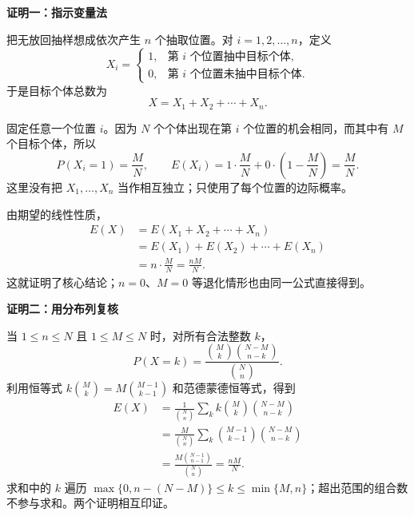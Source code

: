 \clearpage
\begin{proofbox}
	\textbf{\textcolor{CProof}{证明一：指示变量法}}

	把无放回抽样想成依次产生 $n$ 个抽取位置。对 $i=1,2,\ldots,n$，定义
	\[
		X_i=
		\begin{cases}
			1,&\text{第 $i$ 个位置抽中目标个体},\\
			0,&\text{第 $i$ 个位置未抽中目标个体}.
		\end{cases}
	\]
	于是目标个体总数为
	\[
		X=X_1+X_2+\cdots+X_n.
	\]

	固定任意一个位置 $i$。因为 $N$ 个个体出现在第 $i$ 个位置的机会相同，而其中有 $M$ 个目标个体，所以
	\[
		P(X_i=1)=\frac{M}{N},
		\qquad
		E(X_i)=1\cdot\frac{M}{N}+0\cdot\left(1-\frac{M}{N}\right)=\frac{M}{N}.
	\]
	这里没有把 $X_1,\ldots,X_n$ 当作相互独立；只使用了每个位置的边际概率。

	由期望的线性性质，
	\[
		\begin{aligned}
			E(X)
			&=E(X_1+X_2+\cdots+X_n)\\
			&=E(X_1)+E(X_2)+\cdots+E(X_n)\\
			&=n\cdot\frac{M}{N}
			=\frac{nM}{N}.
		\end{aligned}
	\]
	这就证明了核心结论；$n=0$、$M=0$ 等退化情形也由同一公式直接得到。

	\medskip
	\textbf{\textcolor{CProof}{证明二：用分布列复核}}

	当 $1\le n\le N$ 且 $1\le M\le N$ 时，对所有合法整数 $k$，
	\[
		P(X=k)=\frac{\binom{M}{k}\binom{N-M}{n-k}}{\binom{N}{n}}.
	\]
	利用恒等式 $k\binom{M}{k}=M\binom{M-1}{k-1}$ 和范德蒙德恒等式，得到
	\[
		\begin{aligned}
			E(X)
			&=\frac{1}{\binom{N}{n}}
			  \sum_{k}k\binom{M}{k}\binom{N-M}{n-k}\\
			&=\frac{M}{\binom{N}{n}}
			  \sum_{k}\binom{M-1}{k-1}\binom{N-M}{n-k}\\
			&=\frac{M\binom{N-1}{n-1}}{\binom{N}{n}}
			=\frac{nM}{N}.
		\end{aligned}
	\]
	求和中的 $k$ 遍历 $\max\{0,n-(N-M)\}\le k\le\min\{M,n\}$；超出范围的组合数不参与求和。两个证明相互印证。
\end{proofbox}
